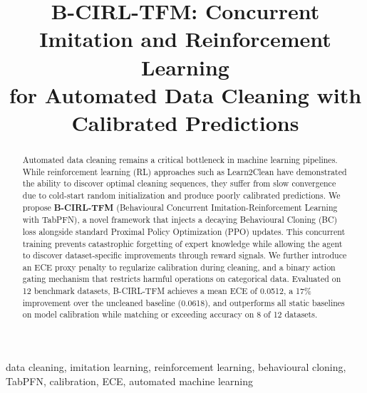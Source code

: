 \documentclass[conference]{IEEEtran}
\begin{document}
\title{B-CIRL-TFM: Concurrent Imitation and Reinforcement Learning\\
for Automated Data Cleaning with Calibrated Predictions}

\author{
\and
{}
\and
{}
}

\maketitle

\begin{abstract}
Automated data cleaning remains a critical bottleneck in machine learning
pipelines. While reinforcement learning (RL) approaches such as Learn2Clean
have demonstrated the ability to discover optimal cleaning sequences, they
suffer from slow convergence due to cold-start random initialization and
produce poorly calibrated predictions. We propose \textbf{B-CIRL-TFM}
(Behavioural Concurrent Imitation-Reinforcement Learning with TabPFN),
a novel framework that injects a decaying Behavioural Cloning (BC) loss
alongside standard Proximal Policy Optimization (PPO) updates. This
concurrent training prevents catastrophic forgetting of expert knowledge
while allowing the agent to discover dataset-specific improvements through
reward signals. We further introduce an ECE proxy penalty to regularize
calibration during cleaning, and a binary action gating mechanism that
restricts harmful operations on categorical data. Evaluated on 12 benchmark
datasets, B-CIRL-TFM achieves a mean ECE of 0.0512, a 17\% improvement
over the uncleaned baseline (0.0618), and outperforms all static baselines
on model calibration while matching or exceeding accuracy on 8 of 12
datasets.
\end{abstract}

\begin{IEEEkeywords}
data cleaning, imitation learning, reinforcement learning, behavioural cloning,
TabPFN, calibration, ECE, automated machine learning
\end{IEEEkeywords}
\end{document}
